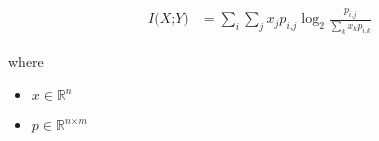\documentclass[12pt]{article}
\begin{document}
\begin{align*}
\textit{I(X;Y)} & = \sum_\textit{i} \sum_\textit{j} \textit{x}_{ \textit{j} }\textit{p}_{\textit{i}, \textit{j}} \log_2{ \frac{\textit{p}_{\textit{i}, \textit{j}}}{\sum_\textit{k} \textit{x}_{ \textit{k} }\textit{p}_{\textit{i}, \textit{k}}} }
\end{align*}

where
\begin{itemize}
\item $\textit{x} \in \mathbb{R}^{ \textit{n}}$
\item $\textit{p} \in \mathbb{R}^{ \textit{n} \times \textit{m} }$
\end{itemize}
\end{document}

